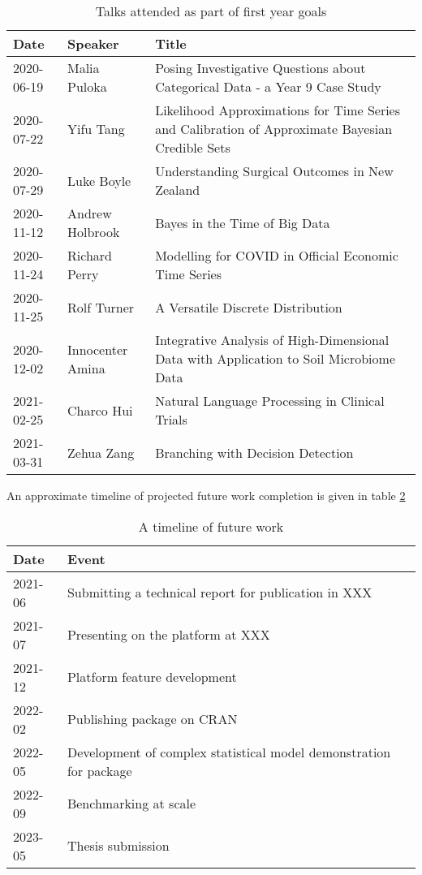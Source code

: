 \begin{table}[h]
        \centering
        \begin{tabularx}{\textwidth}{llX}
                \toprule
                Date & Speaker & Title\\
                \midrule
                2020-06-19 & Malia Puloka & Posing Investigative Questions about Categorical Data - a Year 9 Case Study\\
                2020-07-22 & Yifu Tang & Likelihood Approximations for Time Series and Calibration of Approximate Bayesian Credible Sets\\
                2020-07-29 & Luke Boyle & Understanding Surgical Outcomes in New Zealand\\
                2020-11-12 & Andrew Holbrook & Bayes in the Time of Big Data\\
                2020-11-24 & Richard Perry & Modelling for COVID in Official Economic Time Series\\
                2020-11-25 & Rolf Turner & A Versatile Discrete Distribution\\
                2020-12-02 & Innocenter Amina & Integrative Analysis of High-Dimensional Data with Application to Soil Microbiome Data\\
                2021-02-25 & Charco Hui & Natural Language Processing in Clinical Trials\\
                2021-03-31 & Zehua Zang & Branching with Decision Detection\\
                \bottomrule
        \end{tabularx}
        \caption{\label{talks}Talks attended as part of first year goals}
\end{table}

An approximate timeline of projected future work completion is given in table \ref{future-timeline}

\begin{table}[h]
        \centering
        \begin{tabularx}{\textwidth}{lX}
                \toprule
                Date & Event\\
                \midrule
                2021-06 & Submitting a technical report for publication in XXX\\
                2021-07 & Presenting on the platform at XXX\\
                2021-12 & Platform feature development\\
                2022-02 & Publishing package on CRAN\\
                2022-05 & Development of complex statistical model demonstration for package\\
                2022-09 & Benchmarking at scale\\
                2023-05 & Thesis submission\\
                \bottomrule
        \end{tabularx}
        \caption{\label{future-timeline}A timeline of future work}
\end{table}
